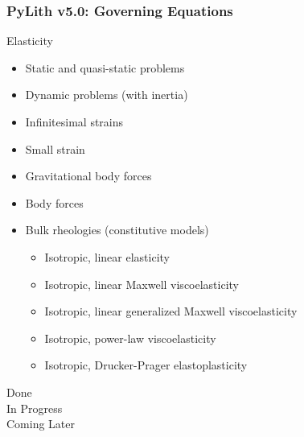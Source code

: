 \documentclass[aspectratio=169]{beamer}
\begin{document}
\newcommand{\statuslater}[1]{{\color{purple}#1}}
\newcommand{\statusdone}[1]{{\color{green}#1}}
\newcommand{\statusbuggy}[1]{{\color{red}#1}}
\newcommand{\statusinprogress}[1]{{\color{orange}#1}}
\begin{frame}
  \frametitle{PyLith v5.0: Governing Equations}
  \summary{}

  Elasticity
  \begin{itemize}
  \item \statusdone{Static and quasi-static problems}
  \item \statusinprogress{Dynamic problems (with inertia)}
  \item \statusdone{Infinitesimal strains}
  \item \statusinprogress{Small strain}
  \item \statusdone{Gravitational body forces}
  \item \statusdone{Body forces}
  \item Bulk rheologies (constitutive models)
    \begin{itemize}
    \item \statusdone{Isotropic, linear elasticity}
    \item \statusdone{Isotropic, linear Maxwell viscoelasticity}
    \item \statusdone{Isotropic, linear generalized Maxwell viscoelasticity}
    \item \statusdone{Isotropic, power-law viscoelasticity}
    \item \statusinprogress{Isotropic, Drucker-Prager elastoplasticity}
    \end{itemize}
  \end{itemize}
  \vfill\hfill%
  \begin{minipage}{0.25\textwidth}
    \statusdone{Done}\\
    \statusinprogress{In Progress}\\
    \statuslater{Coming Later}
  \end{minipage}  
\end{frame}
\end{document}
